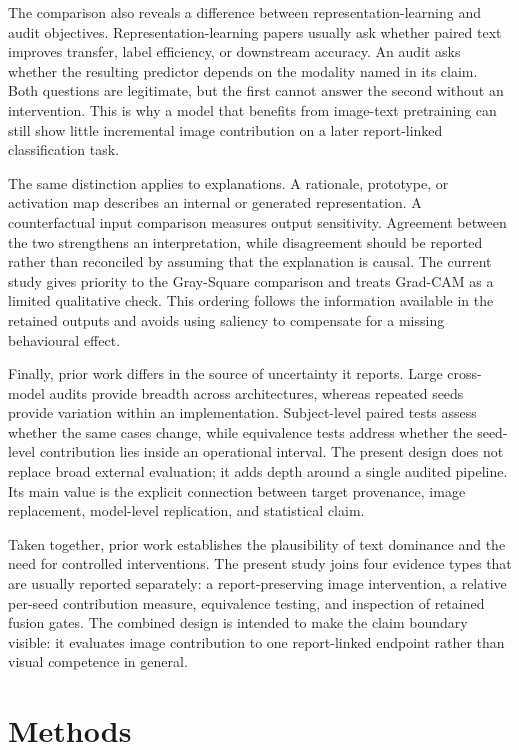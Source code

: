 \documentclass[10pt,a4paper,twocolumn]{article}
\begin{document}
The comparison also reveals a difference between representation-learning and
audit objectives. Representation-learning papers usually ask whether paired
text improves transfer, label efficiency, or downstream accuracy. An audit asks
whether the resulting predictor depends on the modality named in its claim.
Both questions are legitimate, but the first cannot answer the second without
an intervention. This is why a model that benefits from image-text pretraining
can still show little incremental image contribution on a later report-linked
classification task.

The same distinction applies to explanations. A rationale, prototype, or
activation map describes an internal or generated representation. A
counterfactual input comparison measures output sensitivity. Agreement between
the two strengthens an interpretation, while disagreement should be reported
rather than reconciled by assuming that the explanation is causal. The current
study gives priority to the Gray-Square comparison and treats Grad-CAM as a
limited qualitative check. This ordering follows the information available in
the retained outputs and avoids using saliency to compensate for a missing
behavioural effect.

Finally, prior work differs in the source of uncertainty it reports. Large
cross-model audits provide breadth across architectures, whereas repeated seeds
provide variation within an implementation. Subject-level paired tests assess
whether the same cases change, while equivalence tests address whether the
seed-level contribution lies inside an operational interval. The present design
does not replace broad external evaluation; it adds depth around a single
audited pipeline. Its main value is the explicit connection between target
provenance, image replacement, model-level replication, and statistical claim.

Taken together, prior work establishes the plausibility of text dominance and
the need for controlled interventions. The present study joins four evidence
types that are usually reported separately: a report-preserving image
intervention, a relative per-seed contribution measure, equivalence testing,
and inspection of retained fusion gates. The combined design is intended to
make the claim boundary visible: it evaluates image contribution to one
report-linked endpoint rather than visual competence in general.

\section{Methods}\label{sec:methods}
\end{document}
